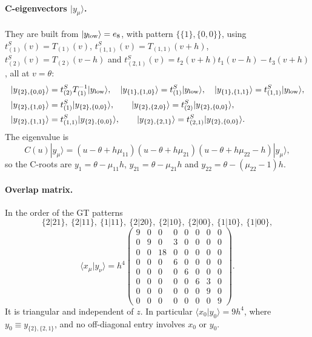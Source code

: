 \documentclass[11pt]{article}
\newcommand{\ket}[1]{|#1\rangle}
\begin{document}
\paragraph{C-eigenvectors $\ket{y_\mu}$.} They are built from $\ket{y_{\rm low}}=e_8$, with pattern $\{\{1\},\{0,0\}\}$, using $t^S_{(1)}(v)=T_{(1)}(v)$, $t^S_{(1,1)}(v)=T_{(1,1)}(v+h)$, $t^S_{(2)}(v)=T_{(2)}(v-h)$ and $t^S_{(2,1)}(v)=t_2(v+h)t_1(v-h)-t_3(v+h)$, all at $v=\theta$:
\begin{align*}
&\ket{y_{\{2\},\{0,0\}}}=t^S_{(2)}T_{(1)}^{-1}\ket{y_{\rm low}},\quad \ket{y_{\{1\},\{1,0\}}}=t^S_{(1)}\ket{y_{\rm low}},\quad \ket{y_{\{1\},\{1,1\}}}=t^S_{(1,1)}\ket{y_{\rm low}},\\
&\ket{y_{\{2\},\{1,0\}}}=t^S_{(1)}\ket{y_{\{2\},\{0,0\}}},\qquad \ket{y_{\{2\},\{2,0\}}}=t^S_{(2)}\ket{y_{\{2\},\{0,0\}}},\\
&\ket{y_{\{2\},\{1,1\}}}=t^S_{(1,1)}\ket{y_{\{2\},\{0,0\}}},\qquad \ket{y_{\{2\},\{2,1\}}}=t^S_{(2,1)}\ket{y_{\{2\},\{0,0\}}}.
\end{align*}
The eigenvalue is
\begin{equation}
C(u)\ket{y_\mu}=(u-\theta+h\mu_{11})(u-\theta+h\mu_{21})(u-\theta+h\mu_{22}-h)\ket{y_\mu},
\end{equation}
so the C-roots are $y_1=\theta-\mu_{11}h$, $y_{21}=\theta-\mu_{21}h$ and $y_{22}=\theta-(\mu_{22}-1)h$.

\paragraph{Overlap matrix.} In the order of the GT patterns
\[\{2|21\},\ \{2|11\},\ \{1|11\},\ \{2|20\},\ \{2|10\},\ \{2|00\},\ \{1|10\},\ \{1|00\},\]
\begin{equation}
\langle x_\mu|y_\nu\rangle=h^4\begin{pmatrix}
9&0&0&0&0&0&0&0\\0&9&0&3&0&0&0&0\\0&0&18&0&0&0&0&0\\0&0&0&6&0&0&0&0\\0&0&0&0&6&0&0&0\\0&0&0&0&0&6&3&0\\0&0&0&0&0&0&9&0\\0&0&0&0&0&0&0&9
\end{pmatrix}.
\end{equation}
It is triangular and independent of $z$. In particular $\langle x_0|y_0\rangle=9h^4$, where $y_0\equiv y_{\{2\},\{2,1\}}$, and no off-diagonal entry involves $x_0$ or $y_0$.
\end{document}

